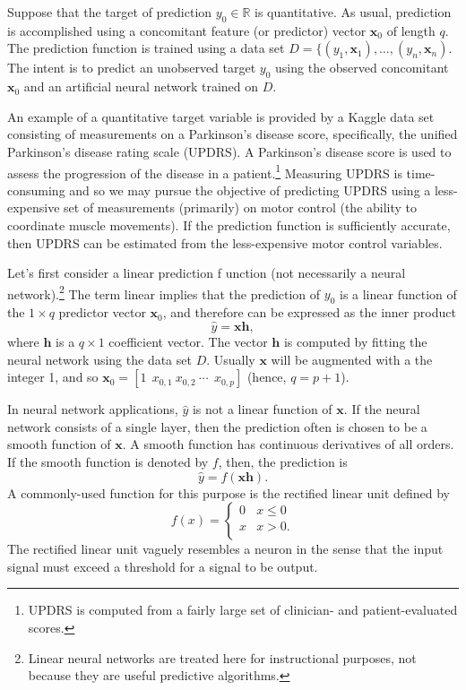 \documentclass[graybox,envcountchap]{svmono}
\newcommand{\hf}{\mathbf{h}}
\newcommand{\xf}{\mathbf{x}}
\newcommand{\nn}{neural network}
\newcommand{\w}{\widehat}
\begin{document}
Suppose that the target of prediction $y_0 \in \mathbb{R}$ is quantitative. As usual, prediction is accomplished using a concomitant feature (or predictor) vector $\xf_0$ of length $q$. The prediction function is trained using a data set $D = \{(y_1,\xf_1),\ldots,(y_n,\xf_n)$.  The intent is to predict an unobserved target $y_0$ using the observed concomitant $\xf_0$ and an artificial {\nn } trained on $D$. 

An example of a quantitative target variable is provided by a Kaggle data set consisting of measurements on a Parkinson's disease score, specifically, the unified Parkinson's disease rating scale (UPDRS). A Parkinson's disease score is used to assess the progression of the disease in a patient.\footnote{UPDRS is computed from a fairly large set of clinician- and patient-evaluated scores. } Measuring UPDRS is time-consuming and so we may pursue the objective of predicting UPDRS using a less-expensive set of measurements (primarily) on motor control (the ability to coordinate muscle movements). If the prediction function is sufficiently accurate, then UPDRS can be estimated from the less-expensive motor control variables.

Let's first consider a linear prediction f unction (not necessarily a \nn).\footnote{Linear \nn s are treated here for instructional purposes, not because they are useful predictive algorithms.}   
The term linear implies that the prediction of $y_0$ is a linear function of the $1 \times q$ predictor vector $\xf_0$, and therefore can be expressed as the inner product
\begin{equation*}
 \w{y} =\xf\hf,
\end{equation*}
where $\hf$ is a $q \times 1$  coefficient vector. The vector $\hf$ is computed by fitting the \nn{ using} the data set $D$. Usually $\xf$ will be augmented with a the integer 1, and so $\xf_0 = [1 \ \ x_{0,1} \ x_{0,2} \ \cdots \ \ x_{0,p}]$ (hence, $q = p+ 1$). 

In \nn{ applications}, $\w{y}$ is not a linear function of $\xf$. If the {\nn  } consists of a single layer, then the prediction often is chosen to be a smooth function of $\xf$. A smooth function has continuous derivatives of all orders. If the smooth function is denoted by $f$, then, the prediction is 
\begin{equation*}
 \w{y} = f(\xf\hf). 
\end{equation*}
A commonly-used function for this purpose is the rectified linear unit defined by
\begin{equation}\label{eq:rlu}
 f(x) = 
 \begin{cases}
  0 & x \le 0\\
  x & x > 0.\\
 \end{cases}
\end{equation}
The  rectified linear unit vaguely resembles a neuron in the sense that the input signal must exceed a threshold for a signal to be output. 
\end{document}

